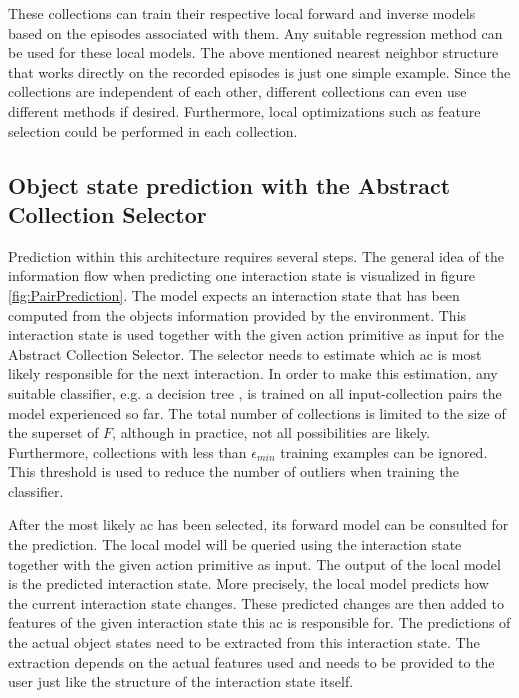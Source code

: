 These collections can train their respective local forward and inverse models based on the episodes associated with them. Any suitable regression method can be used for these local models. The above mentioned nearest neighbor structure that works directly on the recorded episodes is just one simple example. Since the collections are independent of each other, different collections can even use different methods if desired. Furthermore, local optimizations such as feature selection could be performed in each collection. %

\subsection{Object state prediction with the Abstract Collection Selector \label{sec:pairPrediction}}

Prediction within this architecture requires several steps. The general idea of the information flow when predicting one interaction state is visualized in figure \ref{fig:PairPrediction}. The model expects an interaction state that has been computed from the objects information provided by the environment. This interaction state is used together with the given action primitive as input for the Abstract Collection Selector. The selector needs to estimate which \gls{ac} is most likely responsible for the next interaction. In order to make this estimation, any suitable classifier, e.g. a decision tree \cite{decisionTree}, is trained on all input-collection pairs the model experienced so far. 
The total number of collections is limited to the size of the superset of $F$, although in practice, not all possibilities are likely. Furthermore, collections with less than $\epsilon_{min}$ training examples can be ignored. This threshold is used to reduce the number of outliers when training the classifier. %

After the most likely \gls{ac} has been selected, its forward model can be consulted for the prediction. The local model will be queried using the interaction state together with the given action primitive as input. The output of the local model is the predicted interaction state. 
More precisely, the local model predicts how the current interaction state changes. These predicted changes are then added to features of the given interaction state this \gls{ac} is responsible for.
The predictions of the actual object states need to be extracted from this interaction state. The extraction depends on the actual features used and needs to be provided to the user just like the structure of the interaction state itself.

